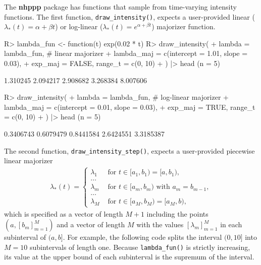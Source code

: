 \documentclass[10pt,letterpaper]{article}
\newcommand{\pkg}[1]{{\bf #1}}
\newcommand{\fct}[1]{\texttt{#1()}}
\begin{document}
The \pkg{nhppp} package has functions that sample from time-varying intensity functions. The first function, \fct{draw\_intensity}, expects a user-provided linear ($\lambda_*(t) = \alpha + \beta t$) or log-linear ($\lambda_*(t) = e^{\alpha + \beta t}$) majorizer function.

\begin{Schunk}
\begin{Sinput}
R> lambda_fun <- function(t) exp(0.02 * t)
R> draw_intensity(
+    lambda = lambda_fun, # linear majorizer
+    lambda_maj = c(intercept = 1.01, slope = 0.03),
+    exp_maj = FALSE, range_t = c(0, 10)
+  ) |> head (n = 5)
\end{Sinput}
\begin{Soutput}
[1] 1.310245 2.094217 2.908682 3.268384 8.007606
\end{Soutput}
\begin{Sinput}
R> draw_intensity(
+    lambda = lambda_fun, # log-linear majorizer
+    lambda_maj = c(intercept = 0.01, slope = 0.03),
+    exp_maj = TRUE, range_t = c(0, 10)
+  ) |> head (n = 5)
\end{Sinput}
\begin{Soutput}
[1] 0.3406743 0.6079479 0.8441584 2.6424551 3.3185387
\end{Soutput}
\end{Schunk}


The second function, \fct{draw\_intensity\_step}, expects a user-provided piecewise linear majorizer
\begin{align*}
    \lambda_*(t) = \begin{cases}
    \lambda_1 &\textrm{ for } t \in [a_1, b_1) = [a, b_1), \\
    \dots &\\
    \lambda_m &\textrm{ for } t \in [a_m, b_m) \textrm{ with } a_{m} = b_{m-1}, \\
    \dots &\\
    \lambda_M &\textrm{ for } t \in [a_M, b_M) = [a_M, b),
    \end{cases}
\end{align*}
which is specified as a vector of length $M+1$ including the points $(a, [b_m]_{m=1}^M)$ and a vector of length $M$ with the values $[\lambda_m]_{m=1}^M$ in each subinterval of $(a, b]$. For example, the following code splits the interval $(0, 10]$ into $M=10$ subintervals of length one. Because \fct{lambda\_fun} is strictly increasing, its value at the upper bound of each subinterval is the supremum of the interval. 
\end{document}

